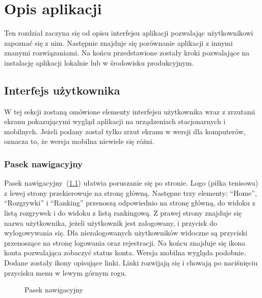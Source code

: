 \documentclass[shortabstract]{iithesis}
\begin{document}
\chapter{Opis aplikacji}
Ten rozdział zaczyna się od opisu interfejsu aplikacji pozwalając użytkownikowi zapoznać się z nim.
Następnie znajduje się porównanie aplikacji z innymi znanymi rozwiązaniami.
Na końcu przedstawione zostały kroki pozwalające na instalację aplikacji lokalnie lub w środowisku produkcyjnym.
\section{Interfejs użytkownika}
W tej sekcji zostaną omówione elementy interfejsu użytkownika wraz z zrzutami ekranu pokazującymi wygląd aplikacji na urządzeniach stacjonarnych i mobilnych.
Jeżeli podany został tylko zrzut ekranu w wersji dla komputerów, oznacza to, że wersja mobilna niewiele się różni.
\subsection{Pasek nawigacyjny}
Pasek nawigacyjny~(\ref{fig:navigation_bar}) ułatwia poruszanie się po stronie. Logo (piłka tenisowa) z lewej strony przekierowuje na stronę główną.
Następne trzy elementy: ``Home'', ``Rozgrywki'' i ``Ranking'' przenoszą odpowiednio na stronę główną, do widoku z listą rozgrywek i do widoku z listą rankingową.
Z prawej strony znajduje się nazwa użytkownika, jeżeli użytkownik jest zalogowany, i przycisk do wylogowywania się.
Dla niezalogowanych użytkowników widoczne są przyciski przenoszące na stronę logowania oraz rejestracji.
Na końcu znajduje się ikona konta pozwalająca zobaczyć status konta. Wersja mobilna wygląda podobnie.
Dodane zostały ikony opisujące linki. Linki rozwijają się i chowają po naciśnięciu przycisku menu w lewym górnym rogu.

\newpage
\begin{figure}[H]
    \centering
    \hfill
    \caption{Pasek nawigacyjny}
    \label{fig:navigation_bar}
\end{figure}
\end{document}
